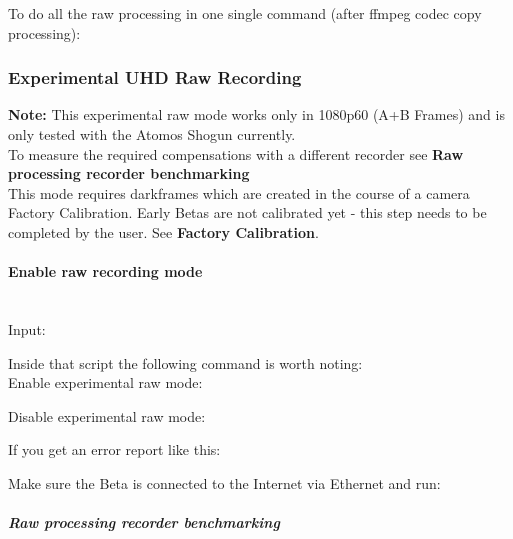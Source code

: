 To do all the raw processing in one single command (after ffmpeg codec copy processing): 

	
	
\subsubsection{Experimental UHD Raw Recording}

\textbf{Note:} This experimental raw mode works only in 1080p60 (A+B Frames) and is only tested with the Atomos Shogun currently. \\

To measure the required compensations with a different recorder see \textbf{Raw processing recorder benchmarking}\\

This mode requires darkframes which are created in the course of a camera Factory Calibration. Early Betas are not calibrated yet - this step needs to be completed by the user. See \textbf{Factory Calibration}.\\

\paragraph{Enable raw recording mode}\mbox{}\\

Input:


Inside that script the following command is worth noting:\\

Enable experimental raw mode: 


Disable experimental raw mode: 


If you get an error report like this: 


Make sure the Beta is connected to the Internet via Ethernet and run:     


\subparagraph{Raw processing recorder benchmarking}
	
